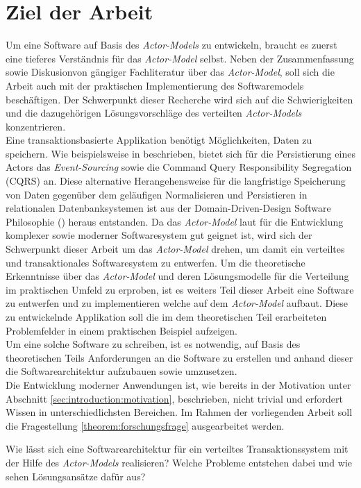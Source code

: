 \section{Ziel der Arbeit}
\label{sec:introduction:workGoal}
\label{sec:introduction:forschungsfrage}
Um eine Software auf Basis des \textit{Actor-Models} zu entwickeln, braucht es zuerst eine tieferes Verständnis für das \textit{Actor-Model} selbst. Neben der Zusammenfassung sowie Diskusionvon gängiger Fachliteratur über das \textit{Actor-Model}, soll sich die Arbeit auch mit der praktischen Implementierung des Softwaremodels beschäftigen. Der Schwerpunkt dieser Recherche wird sich auf die Schwierigkeiten und die dazugehörigen Lösungsvorschläge des verteilten \textit{Actor-Models} konzentrieren. \\
Eine transaktionsbasierte Applikation benötigt Möglichkeiten, Daten zu speichern. Wie beispielsweise in \cite{Vernon2015ReactiveAkka} beschrieben, bietet sich für die Persistierung eines Actors das \textit{Event-Sourcing} sowie die {Command Query Responsibility Segregation (CQRS)} an. Diese alternative Herangehensweise für die langfristige Speicherung von Daten gegenüber dem geläufigen Normalisieren und Persistieren in relationalen Datenbanksystemen ist aus der Domain-Driven-Design Software Philosophie (\cite{Evans2004Domain-drivenSoftware}) heraus  entstanden. Da das \textit{Actor-Model} laut \cite{Vernon2015ReactiveAkka} für die Entwicklung komplexer sowie moderner Softwaresystem gut geignet ist, wird sich der Schwerpunkt dieser Arbeit um das \textit{Actor-Model} drehen, um damit ein verteiltes und transaktionales Softwaresystem zu entwerfen.
Um die theoretische Erkenntnisse über das \textit{Actor-Model}  und deren Lösungsmodelle für die Verteilung im praktischen Umfeld zu erproben, ist es weiters Teil dieser Arbeit eine Software zu entwerfen und zu implementieren welche auf dem \textit{Actor-Model} aufbaut. Diese zu entwickelnde Applikation soll die im dem theoretischen Teil erarbeiteten Problemfelder in einem praktischen Beispiel aufzeigen. \\
Um eine solche Software zu schreiben, ist es notwendig, auf Basis des theoretischen Teils Anforderungen an die Software zu erstellen und anhand dieser die Softwarearchitektur aufzubauen sowie umzusetzen. \\
Die Entwicklung moderner Anwendungen ist, wie bereits in der Motivation unter Abschnitt \ref{sec:introduction:motivation}, beschrieben, nicht trivial und erfordert Wissen in unterschiedlichsten Bereichen. Im Rahmen der vorliegenden Arbeit soll die Fragestellung \ref{theorem:forschungsfrage} ausgearbeitet werden. 
\begin{Theorem}
\label{theorem:forschungsfrage}
Wie lässt sich eine Softwarearchitektur für ein verteiltes Transaktionssystem mit der Hilfe des \textit{Actor-Models} realisieren? Welche Probleme entstehen dabei und wie sehen Lösungsansätze dafür aus?
\end{Theorem}

